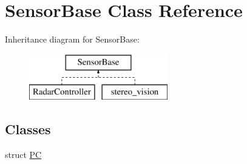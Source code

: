 \hypertarget{class_sensor_base}{}\section{Sensor\+Base Class Reference}
\label{class_sensor_base}
Inheritance diagram for Sensor\+Base\+:\begin{figure}[H]
\begin{center}
\leavevmode
\includegraphics[height=2.000000cm]{class_sensor_base}
\end{center}
\end{figure}
\subsection*{Classes}
\begin{DoxyCompactItemize}
\item 
struct \hyperlink{struct_sensor_base_1_1_p_c}{P\+C}
\end{DoxyCompactItemize}
